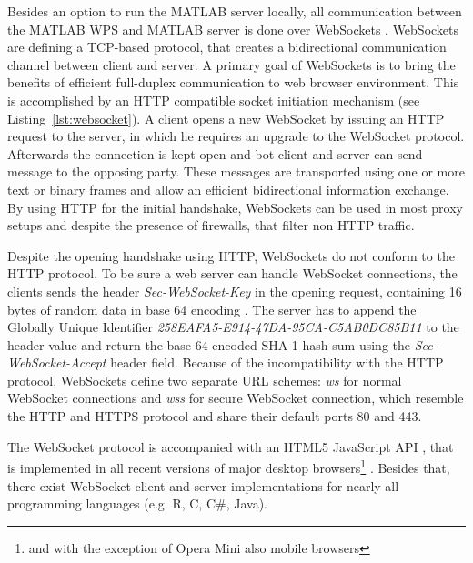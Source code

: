 		Besides an option to run the MATLAB server locally, all communication between the MATLAB WPS and MATLAB server is done over WebSockets \citep{ietf:rfc6455}. WebSockets are defining a TCP-based protocol, that creates a bidirectional communication channel between client and server. A primary goal of WebSockets is to bring the benefits of efficient full-duplex communication to web browser environment. This is accomplished by an HTTP compatible socket initiation mechanism (see Listing~\ref{lst:websocket}). A client opens a new WebSocket by issuing an HTTP request to the server, in which he requires an upgrade to the WebSocket protocol. Afterwards the connection is kept open and bot client and server can send message to the opposing party. These messages are transported using one or more text or binary frames and allow an efficient bidirectional information exchange. By using HTTP for the initial handshake, WebSockets can be used in most proxy setups and despite the presence of firewalls, that filter non HTTP traffic.

		

		Despite the opening handshake using HTTP, WebSockets do not conform to the HTTP protocol. To be sure a web server can handle WebSocket connections, the clients sends the header \emph{Sec-WebSocket-Key} in the opening request, containing 16 bytes of random data in base 64 encoding \citep{ietf:rfc4648}. The server has to append the Globally Unique Identifier \cite[GUID,][]{ietf:rfc4122} \emph{258EAFA5-E914-47DA-95CA-C5AB0DC85B11} to the header value and return the base 64 encoded SHA-1 \citep{NistFIPS1803} hash sum using the \emph{Sec-WebSocket-Accept} header field. Because of the incompatibility with the HTTP protocol, WebSockets define two separate URL schemes: \emph{ws} for normal WebSocket connections and \emph{wss} for secure WebSocket connection, which resemble the HTTP and HTTPS protocol and share their default ports 80 and 443.

		The WebSocket protocol is accompanied with an HTML5 JavaScript API \citep{w3c:ws}, that is implemented in all recent versions of major desktop browsers\footnote{and with the exception of Opera Mini also mobile browsers} \citep{caniuse}. Besides that, there exist WebSocket client and server implementations for nearly all programming languages (e.g. R, C, C\#, Java).

